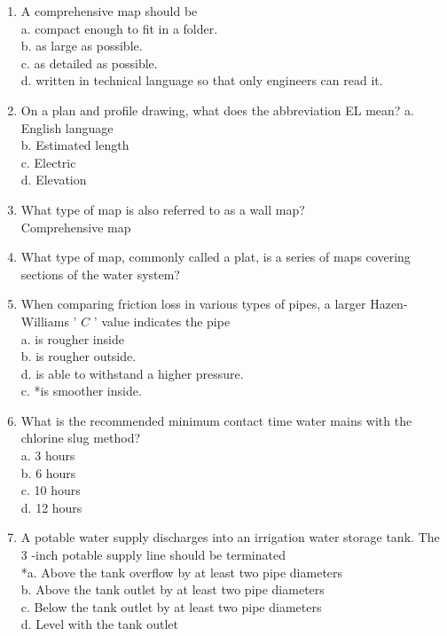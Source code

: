 \begin{enumerate}[1.]
\item A comprehensive map should be\\
a. compact enough to fit in a folder.\\
b. as large as possible.\\
c. as detailed as possible.\\
d. written in technical language so that only engineers can read it.\\
\item On a plan and profile drawing, what does the abbreviation EL mean? a. English language\\
b. Estimated length\\
c. Electric\\
d. Elevation\\
\item What type of map is also referred to as a wall map?\\
Comprehensive map\\
\item What type of map, commonly called a plat, is a series of maps covering sections of the water system?\\
\item When comparing friction loss in various types of pipes, a larger Hazen-Williams ' $C$ ' value indicates the pipe\\
a. is rougher inside\\
b. is rougher outside.\\
d. is able to withstand a higher pressure.\\
c. *is smoother inside.\\
\item What is the recommended minimum contact time water mains with the chlorine slug method?\\
a. 3 hours\\
b. 6 hours\\
c. 10 hours\\
d. 12 hours\\
\item A potable water supply discharges into an irrigation water storage tank. The 3 -inch potable supply line should be terminated\\
*a. Above the tank overflow by at least two pipe diameters\\
b. Above the tank outlet by at least two pipe diameters\\
c. Below the tank outlet by at least two pipe diameters\\
d. Level with the tank outlet\\

\end{enumerate}
